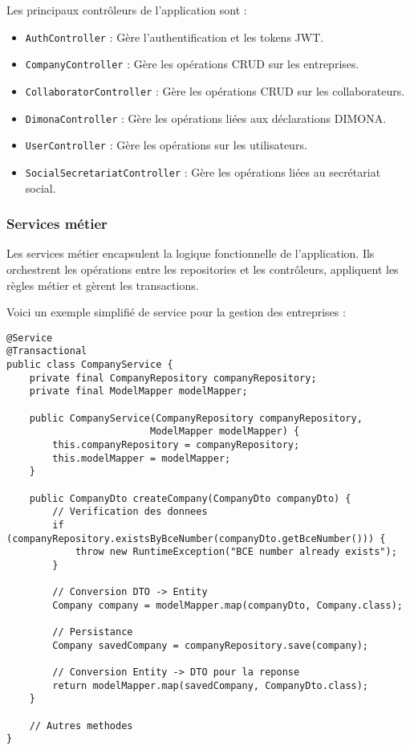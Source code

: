 Les principaux contrôleurs de l'application sont :
\begin{itemize}
  \item \texttt{AuthController} : Gère l'authentification et les tokens JWT.
  \item \texttt{CompanyController} : Gère les opérations CRUD sur les entreprises.
  \item \texttt{CollaboratorController} : Gère les opérations CRUD sur les collaborateurs.
  \item \texttt{DimonaController} : Gère les opérations liées aux déclarations DIMONA.
  \item \texttt{UserController} : Gère les opérations sur les utilisateurs.
  \item \texttt{SocialSecretariatController} : Gère les opérations liées au secrétariat social.
\end{itemize}

\subsubsection{Services métier}

Les services métier encapsulent la logique fonctionnelle de l'application. Ils orchestrent les opérations entre les repositories et les contrôleurs, appliquent les règles métier et gèrent les transactions.

Voici un exemple simplifié de service pour la gestion des entreprises :

\begin{lstlisting}
@Service
@Transactional
public class CompanyService {
    private final CompanyRepository companyRepository;
    private final ModelMapper modelMapper;
    
    public CompanyService(CompanyRepository companyRepository, 
                         ModelMapper modelMapper) {
        this.companyRepository = companyRepository;
        this.modelMapper = modelMapper;
    }
    
    public CompanyDto createCompany(CompanyDto companyDto) {
        // Verification des donnees
        if (companyRepository.existsByBceNumber(companyDto.getBceNumber())) {
            throw new RuntimeException("BCE number already exists");
        }
        
        // Conversion DTO -> Entity
        Company company = modelMapper.map(companyDto, Company.class);
        
        // Persistance
        Company savedCompany = companyRepository.save(company);
        
        // Conversion Entity -> DTO pour la reponse
        return modelMapper.map(savedCompany, CompanyDto.class);
    }
    
    // Autres methodes
}
\end{lstlisting}

